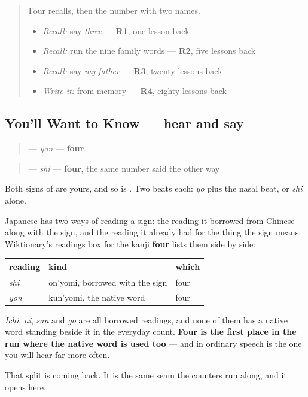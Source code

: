 \begin{quote}
Four recalls, then the number with two names.

\begin{itemize}
\raggedright
  \item \emph{Recall:} say \emph{three} — \textbf{R1}, one lesson back
  \item \emph{Recall:} run the nine family words — \textbf{R2}, five lessons back
  \item \emph{Recall:} say \emph{my father} — \textbf{R3}, twenty lessons back
  \item \emph{Write it:} \textbf{} from memory — \textbf{R4}, eighty lessons back
\end{itemize}
\end{quote}

\subsection*{You'll Want to Know — hear and say}
\begin{quote}
\textbf{} — \emph{yon} — \textbf{four}
\end{quote}

\begin{quote}
\textbf{} — \emph{shi} — \textbf{four}, the same number said the other way
\end{quote}

Both signs of \textbf{} are yours, and so is \textbf{}. Two beats each: \emph{yo} plus the nasal beat, or \emph{shi} alone.

\begin{grammarlens}[title={Grammar Lens — a native word inside a borrowed count}]
Japanese has two ways of reading a sign: the reading it borrowed from Chinese along with the sign, and the reading it already had for the thing the sign means. Wiktionary's readings box for the kanji \textbf{four} lists them side by side:

\noindent
\begin{tabularx}{\linewidth}{@{}>{\raggedright\arraybackslash}X>{\raggedright\arraybackslash}X>{\raggedright\arraybackslash}X@{}}
\toprule
\textbf{reading} & \textbf{kind} & \textbf{which} \\
\midrule
\textbf{\ja{し}} \emph{shi} & on'yomi, borrowed with the sign & four \\
\textbf{\ja{よん}} \emph{yon} & kun'yomi, the native word & four \\
\bottomrule
\end{tabularx}

\emph{Ichi}, \emph{ni}, \emph{san} and \emph{go} are all borrowed readings, and none of them has a native word standing beside it in the everyday count. \textbf{Four is the first place in the run where the native word is used too} — and in ordinary speech \textbf{} is the one you will hear far more often.

That split is coming back. It is the same seam the counters run along, and it opens here.
\end{grammarlens}

